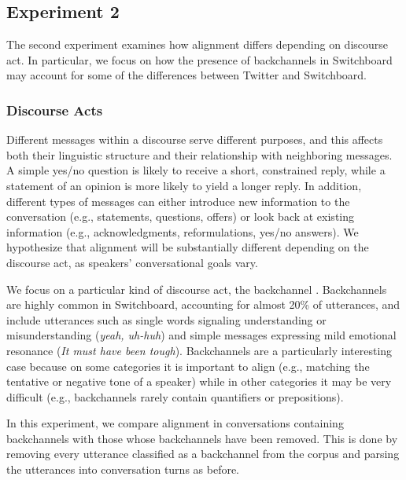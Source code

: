 \documentclass[11pt]{article}
\begin{document}
{\subsection{Experiment 2}

The second experiment examines how alignment differs depending on discourse act. In particular, we focus on how the presence of backchannels in Switchboard may account for some of the differences between Twitter and Switchboard. 

\subsubsection{Discourse Acts}
Different messages within a discourse serve different purposes, and this affects both their linguistic structure and their relationship with neighboring messages.  A simple yes/no question is likely to receive a short, constrained reply, while a statement of an opinion is more likely to yield a longer reply. In addition, different types of messages can either introduce new information to the conversation (e.g., statements, questions, offers) or look back at existing information (e.g., acknowledgments, reformulations, yes/no answers). We hypothesize that alignment will be substantially different depending on the discourse act, as speakers' conversational goals vary.

We focus on a particular kind of discourse act, the backchannel \cite{Yngve1970}. Backchannels are highly common in Switchboard, accounting for almost 20\% of utterances, and include utterances such as single words signaling understanding or misunderstanding (\textit{yeah, uh-huh}) and simple messages expressing mild emotional resonance (\textit{It must have been tough}).  Backchannels are a particularly interesting case because on some categories it is important to align (e.g., matching the tentative or negative tone of a speaker) while in other categories it may be very difficult (e.g., backchannels rarely contain quantifiers or prepositions).

In this experiment, we compare alignment in conversations containing backchannels with those whose backchannels have been removed. This is done by removing every utterance classified as a backchannel from the corpus and parsing the utterances into conversation turns as before. 

}
\end{document}
